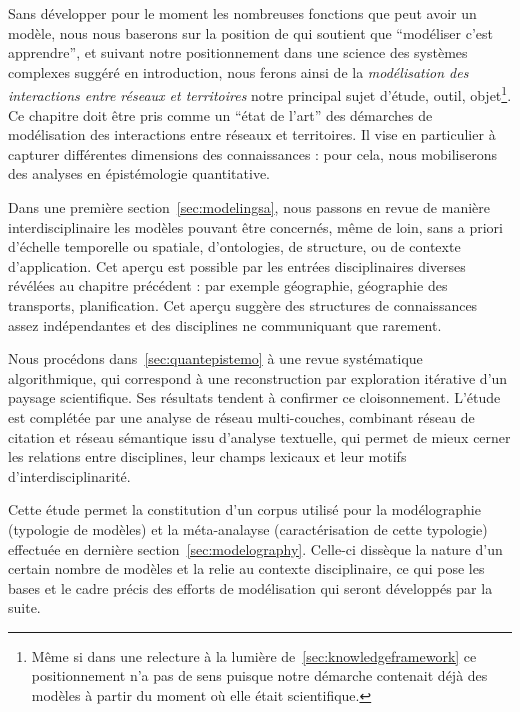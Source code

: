 Sans développer pour le moment les nombreuses fonctions que peut avoir un modèle, nous nous baserons sur la position de  qui soutient que ``modéliser c'est apprendre'', et suivant notre positionnement dans une science des systèmes complexes suggéré en introduction, nous ferons ainsi de la \emph{modélisation des interactions entre réseaux et territoires} notre principal sujet d'étude, outil, objet\footnote{Même si dans une relecture à la lumière de~\ref{sec:knowledgeframework} ce positionnement n'a pas de sens puisque notre démarche contenait déjà des modèles à partir du moment où elle était scientifique.}. Ce chapitre doit être pris comme un ``état de l'art'' des démarches de modélisation des interactions entre réseaux et territoires. Il vise en particulier à capturer différentes dimensions des connaissances : pour cela, nous mobiliserons des analyses en épistémologie quantitative.


Dans une première section~\ref{sec:modelingsa}, nous passons en revue de manière interdisciplinaire les modèles pouvant être concernés, même de loin, sans a priori d'échelle temporelle ou spatiale, d'ontologies, de structure, ou de contexte d'application. Cet aperçu est possible par les entrées disciplinaires diverses révélées au chapitre précédent : par exemple géographie, géographie des transports, planification. Cet aperçu suggère des structures de connaissances assez indépendantes et des disciplines ne communiquant que rarement.

Nous procédons dans~\ref{sec:quantepistemo} à une revue systématique algorithmique, qui correspond à une reconstruction par exploration itérative d'un paysage scientifique. Ses résultats tendent à confirmer ce cloisonnement. L'étude est complétée par une analyse de réseau multi-couches, combinant réseau de citation et réseau sémantique issu d'analyse textuelle, qui permet de mieux cerner les relations entre disciplines, leur champs lexicaux et leur motifs d'interdisciplinarité.


Cette étude permet la constitution d'un corpus utilisé pour la modélographie (typologie de modèles) et la méta-analayse (caractérisation de cette typologie) effectuée en dernière section~\ref{sec:modelography}. Celle-ci dissèque la nature d'un certain nombre de modèles et la relie au contexte disciplinaire, ce qui pose les bases et le cadre précis des efforts de modélisation qui seront développés par la suite.







